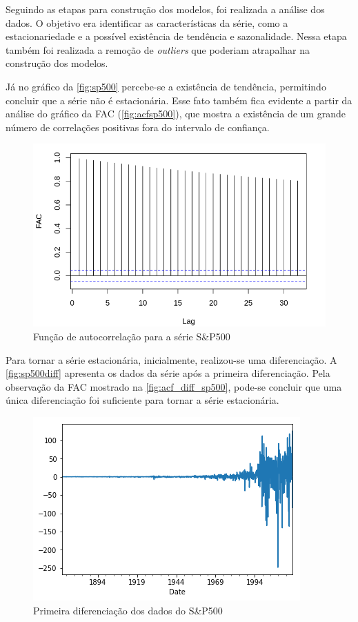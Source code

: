 \documentclass[
    12pt,
    oneside,
    a4paper,
    english,
    brazil
]{abntex2}
\begin{document}
Seguindo  as etapas  para construção  dos modelos,  foi realizada  a análise  dos
dados.  O  objetivo  era  identificar  as  características  da  série,  como  a
estacionariedade e a possível existência de  tendência e  sazonalidade. Nessa etapa também foi realizada a remoção  de \textit{outliers} que poderiam  atrapalhar na
construção dos modelos.

Já no gráfico da \autoref{fig:sp500} percebe-se a existência de  tendência, permitindo concluir que a série não é estacionária. Esse fato também fica evidente a partir da análise do gráfico da FAC (\autoref{fig:acfsp500}),  que
mostra a existência de um  grande número de correlações positivas fora do
intervalo de confiança.

\begin{figure}[ht]
    \centering
    \caption{Função de autocorrelação para a série S\&P500}\label{fig:acfsp500}
    \includegraphics[width=.5\linewidth]{images/SP500_FAC.png}
\end{figure}

Para  tornar  a série  estacionária,  inicialmente, realizou-se  uma
diferenciação.  A \autoref{fig:sp500diff} apresenta os dados da série após a  primeira diferenciação. 
Pela  observação  da FAC mostrado na  \autoref{fig:acf_diff_sp500},
pode-se concluir que uma única diferenciação foi suficiente para tornar a série estacionária.

\begin{figure}[ht]
    \centering
    \caption{Primeira diferenciação dos dados do S\&P500}\label{fig:sp500diff}
    \includegraphics[width=.5\linewidth]{images/sp500diff.png}
\end{figure}
\end{document}
